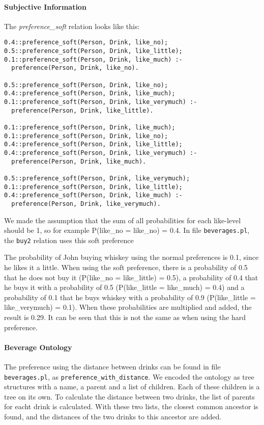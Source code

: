 \documentclass{article}
\begin{document}
\paragraph{Subjective Information}
The \emph{preference\_soft} relation looks like this: 
\begin{verbatim}
0.4::preference_soft(Person, Drink, like_no);
0.5::preference_soft(Person, Drink, like_little);
0.1::preference_soft(Person, Drink, like_much) :-
  preference(Person, Drink, like_no).

0.5::preference_soft(Person, Drink, like_no);
0.4::preference_soft(Person, Drink, like_much);
0.1::preference_soft(Person, Drink, like_verymuch) :-
  preference(Person, Drink, like_little).

0.1::preference_soft(Person, Drink, like_much);
0.1::preference_soft(Person, Drink, like_no);
0.4::preference_soft(Person, Drink, like_little);
0.4::preference_soft(Person, Drink, like_verymuch) :-
  preference(Person, Drink, like_much).

0.5::preference_soft(Person, Drink, like_verymuch);
0.1::preference_soft(Person, Drink, like_little);
0.4::preference_soft(Person, Drink, like_much) :-
  preference(Person, Drink, like_verymuch).
\end{verbatim}
We made the assumption that the sum of all probabilities for each like-level should be 1, so for example P(like\_no = like\_no) = 0.4. In file \texttt{beverages.pl}, the \texttt{buy2} relation uses this soft preference

The probability of John buying whiskey using the normal preferences is 0.1, since he likes it a little. When using the soft preference, there is a probability of 0.5 that he does not buy it (P(like\_no = like\_little) = 0.5), a probability of 0.4 that he buys it with a probability of 0.5 (P(like\_little = like\_much) = 0.4) and a probability of 0.1 that he buys whiskey with a probability of 0.9 (P(like\_little = like\_verymuch) = 0.1). When these probabilities are multiplied and added, the result is 0.29. It can be seen that this is not the same as when using the hard preference.

\paragraph{Beverage Ontology}
The preference using the distance between drinks can be found in file \texttt{beverages.pl}, as \texttt{preference\_with\_distance}. We encoded the ontology as tree structures with a name, a parent and a list of children. Each of these children is a tree on its own. To calculate the distance between two drinks, the list of parents for eacht drink is calculated. With these two lists, the closest common ancestor is found, and the distances of the two drinks to this ancestor are added. 
\end{document}
